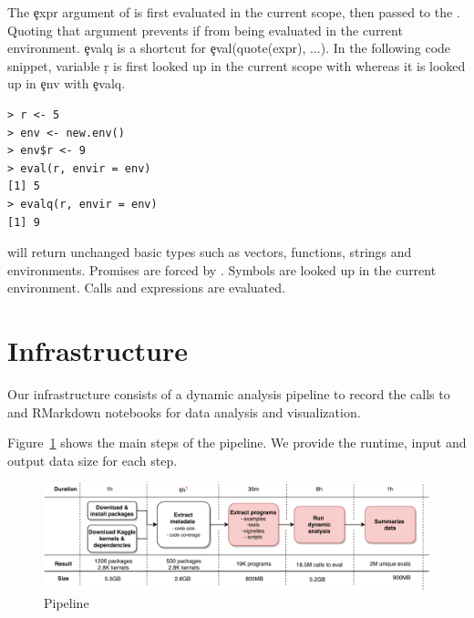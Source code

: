 \documentclass[conference]{IEEEtran}
\begin{document}
The \c{expr} argument of \eval is first evaluated in the current scope, then passed to the \eval. Quoting that argument prevents if from being evaluated in the current environment. \c{evalq} is a shortcut for \c{eval(quote(expr), ...)}. In the following code snippet, variable \c{r} is first looked up in the current scope with \eval whereas it is looked up in \c{env} with \c{evalq}.

\begin{lstlisting}
> r <- 5
> env <- new.env()
> env$r <- 9
> eval(r, envir = env)
[1] 5
> evalq(r, envir = env)
[1] 9
\end{lstlisting}

\eval will return unchanged basic types such as vectors, functions, strings and environments. Promises are forced by \eval. Symbols are looked up in the current environment. Calls and expressions are evaluated. 


\section{Infrastructure}

Our infrastructure consists of a dynamic analysis pipeline to record the calls
to \eval and RMarkdown notebooks for data analysis and visualization.

Figure~\ref{fig:pipeline} shows the main steps of the pipeline. We provide the
runtime, input and output data size for each step.

\begin{figure}[!tb]\centering\includegraphics[width=\linewidth]
{pipeline.pdf}\caption{Pipeline}\label{fig:pipeline}
\end{figure}
\end{document}
